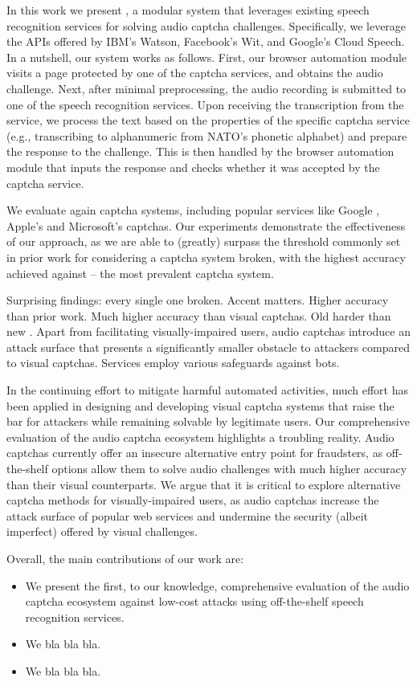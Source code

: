 In this work we present \system, a modular system that leverages existing speech recognition services
for solving audio captcha challenges. Specifically, we leverage the
APIs offered by IBM's Watson, Facebook's Wit, and Google's Cloud Speech. In a nutshell, our system works as
follows. First, our browser automation module visits a page protected by one of the captcha services,
and obtains the audio challenge. Next, after minimal preprocessing, the audio recording is submitted 
to one of the speech recognition services. Upon receiving the transcription from the service, we 
process the text based on the properties of the specific captcha service (e.g., transcribing to alphanumeric 
from NATO's phonetic alphabet) and prepare the response to the challenge. This is then handled by
the browser automation module that inputs the response and checks whether it was accepted by the captcha
service.

We evaluate \system again \no captcha systems, including popular services like Google \re,
Apple's and Microsoft's captchas. Our experiments demonstrate the effectiveness of our approach,
as we are able to (greatly) surpass the threshold commonly set in prior work for considering
a captcha system broken, with the highest accuracy achieved against \re -- the most prevalent 
captcha system.

Surprising findings: every single one broken. Accent matters. Higher accuracy than prior work. Much higher accuracy than
visual captchas. Old \re harder than new \re. 
Apart from facilitating visually-impaired users, audio captchas introduce an attack
surface that presents a significantly smaller obstacle to attackers compared to visual captchas.
Services employ various safeguards against bots.

In the continuing effort to mitigate harmful automated activities, much effort has been applied in 
designing and developing visual captcha systems that raise the bar for attackers while remaining 
solvable by legitimate users. Our comprehensive evaluation of the audio captcha ecosystem highlights
a troubling reality. Audio captchas currently offer an insecure alternative entry point for fraudsters,
as off-the-shelf options allow them to solve audio challenges with much higher accuracy than their visual
counterparts. We argue that it is critical to explore alternative captcha methods for visually-impaired users,
as audio captchas increase the attack surface of popular web services and undermine the security
(albeit imperfect) offered by visual challenges.

Overall, the main contributions of our work are:

\begin{itemize}

\item We present the first, to our knowledge, comprehensive evaluation of 
the audio captcha ecosystem against low-cost 
attacks using off-the-shelf speech recognition services.

\item We bla bla bla.

\item We bla bla bla.

\end{itemize}
